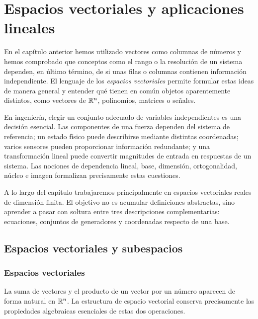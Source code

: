 \chapter{Espacios vectoriales y aplicaciones lineales}
\label{ch:espacios}

En el capítulo anterior hemos utilizado vectores como columnas de números y hemos comprobado que conceptos como el rango o la resolución de un sistema dependen, en último término, de si unas filas o columnas contienen información independiente. El lenguaje de los \emph{espacios vectoriales} permite formular estas ideas de manera general y entender qué tienen en común objetos aparentemente distintos, como vectores de $\mathbb{R}^n$, polinomios, matrices o señales.

En ingeniería, elegir un conjunto adecuado de variables independientes es una decisión esencial. Las componentes de una fuerza dependen del sistema de referencia; un estado físico puede describirse mediante distintas coordenadas; varios sensores pueden proporcionar información redundante; y una transformación lineal puede convertir magnitudes de entrada en respuestas de un sistema. Las nociones de dependencia lineal, base, dimensión, ortogonalidad, núcleo e imagen formalizan precisamente estas cuestiones.

A lo largo del capítulo trabajaremos principalmente en espacios vectoriales reales de dimensión finita. El objetivo no es acumular definiciones abstractas, sino aprender a pasar con soltura entre tres descripciones complementarias: ecuaciones, conjuntos de generadores y coordenadas respecto de una base.

\section{Espacios vectoriales y subespacios}
\label{sec:espacios-subespacios}

\subsection{Espacios vectoriales}

La suma de vectores y el producto de un vector por un número aparecen de forma natural en $\mathbb{R}^n$. La estructura de espacio vectorial conserva precisamente las propiedades algebraicas esenciales de estas dos operaciones.

